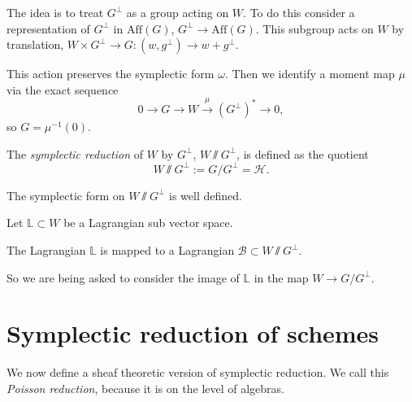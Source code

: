     The idea is to treat \(G^\perp\) as a group acting on \(W\). To do this consider a representation of \(G^\perp\) in \(\mathrm{Aff}(G)\), \(G^\perp \rightarrow \mathrm{Aff}(G)\). This subgroup acts on \(W\) by translation, \( W \times G^{\perp} \rightarrow G : (w,g^{\perp} ) \rightarrow w + g^{\perp} \). 
    
    This action preserves the symplectic form \( \omega\). Then we identify a moment map \( \mu\) via the exact sequence
    \[ 0 \rightarrow G \rightarrow W \stackrel{\mu}{\rightarrow} (G^\perp)^* \rightarrow 0,\]
    so \(G = \mu^{-1}(0)\). 
    
    \begin{defn} The \emph{symplectic reduction} of \(W\) by \(G^{\perp}\), \(W \sslash G^{\perp}\), is defined as the quotient 
    \[ W \sslash G^{\perp} := G/G^\perp = \mathcal{H}. \]
    \end{defn}
    
    \begin{lem}
        The symplectic form on \(W \sslash G^{\perp} \) is well defined.
    \end{lem} 
    
    
    Let  \( \mathbb{L} \subset W\) be a Lagrangian sub vector space.
    
    \begin{lem} 
    The Lagrangian \( \mathbb{L}\) is mapped to a Lagrangian \( \mathcal{B}  \subset  W \sslash G^{\perp} \). 
    \end{lem}
    
    So we are being asked to consider the image of \( \mathbb{L}\) in the map \( W \rightarrow G/G^{\perp}\).
    
    
    
    \section{Symplectic reduction of schemes}
    We now define a sheaf theoretic version of symplectic reduction. We call this \emph{Poisson reduction}, because it is on the level of algebras. 
    
